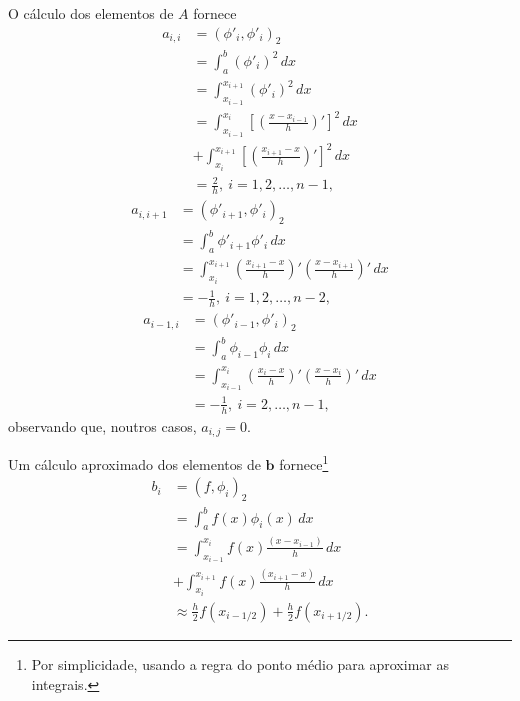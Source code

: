 O cálculo dos elementos de $A$ fornece
\begin{subequations}
  \begin{align}
    a_{i,i} &= (\phi'_i, \phi'_i)_2\\
            &= \int_a^b \left(\phi'_i\right)^2\,dx\\
            &= \int_{x_{i-1}}^{x_{i+1}}(\phi'_i)^2\,dx\\
            &= \int_{x_{i-1}}^{x_{i}} \left[\left(\frac{x-x_{i-1}}{h}\right)'\right]^2\,dx\\
            &+ \int_{x_{i}}^{x_{i+1}} \left[\left(\frac{x_{i+1}-x}{h}\right)'\right]^2\,dx\\
            &= \frac{2}{h}, ~i=1, 2, \dotsc, n-1,
  \end{align}
\end{subequations}
\begin{subequations}
  \begin{align}
    a_{i,i+1} &= (\phi'_{i+1}, \phi'_i)_2\\
            &= \int_a^b \phi'_{i+1}\phi'_i\,dx\\
            &= \int_{x_i}^{x_{i+1}}\left(\frac{x_{i+1}-x}{h}\right)'\left(\frac{x - x_{i+1}}{h}\right)'\,dx\\
            &= -\frac{1}{h}, ~i=1, 2, \dotsc, n-2,
  \end{align}
\end{subequations}
\begin{subequations}
  \begin{align}
    a_{i-1,i} &= (\phi'_{i-1}, \phi'_i)_2\\
            &= \int_a^b \phi_{i-1}\phi_i\,dx\\
            &= \int_{x_{i-1}}^{x_{i}}\left(\frac{x_i-x}{h}\right)'\left(\frac{x - x_{i}}{h}\right)'\,dx\\
            &= -\frac{1}{h}, ~i=2, \dotsc, n-1,
  \end{align}
\end{subequations}
observando que, noutros casos, $a_{i,j} = 0$.

Um cálculo aproximado dos elementos de $\pmb{b}$ fornece\footnote{Por simplicidade, usando a regra do ponto médio para aproximar as integrais.}
\begin{subequations}
  \begin{align}
    b_i &= (f, \phi_i)_2\\
        &= \int_a^b f(x)\phi_i(x)\,dx\\
        &= \int_{x_{i-1}}^{x_{i}} f(x)\frac{(x-x_{i-1})}{h}\,dx\\
        &+ \int_{x_{i}}^{x_{i+1}} f(x)\frac{(x_{i+1}-x)}{h}\,dx\\
        &\approx \frac{h}{2}f(x_{i-1/2}) + \frac{h}{2}f(x_{i+1/2}).
  \end{align}
\end{subequations}

